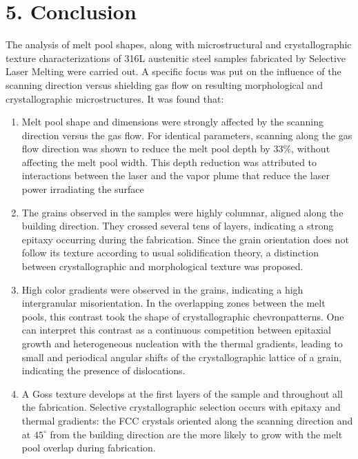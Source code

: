 \documentclass[10pt]{article}
\begin{document}
\section*{5. Conclusion}
The analysis of melt pool shapes, along with microstructural and crystallographic texture characterizations of 316L austenitic steel samples fabricated by Selective Laser Melting were carried out. A specific focus was put on the influence of the scanning direction versus shielding gas flow on resulting morphological and crystallographic microstructures. It was found that:

\begin{enumerate}
  \item Melt pool shape and dimensions were strongly affected by the scanning direction versus the gas flow. For identical parameters, scanning along the gas flow direction was shown to reduce the melt pool depth by $33 \%$, without affecting the melt pool width. This depth reduction was attributed to interactions between the laser and the vapor plume that reduce the laser power irradiating the surface

  \item The grains observed in the samples were highly columnar, aligned along the building direction. They crossed several tens of layers, indicating a strong epitaxy occurring during the fabrication. Since the grain orientation does not follow its texture according to usual solidification theory, a distinction between crystallographic and morphological texture was proposed.

  \item High color gradients were observed in the grains, indicating a high intergranular misorientation. In the overlapping zones between the melt pools, this contrast took the shape of crystallographic chevronpatterns. One can interpret this contrast as a continuous competition between epitaxial growth and heterogeneous nucleation with the thermal gradients, leading to small and periodical angular shifts of the crystallographic lattice of a grain, indicating the presence of dislocations.

  \item A Goss texture develops at the first layers of the sample and throughout all the fabrication. Selective crystallographic selection occurs with epitaxy and thermal gradients: the FCC crystals oriented along the scanning direction and at $45^{\circ}$ from the building direction are the more likely to grow with the melt pool overlap during fabrication.

\end{enumerate}
\end{document}
